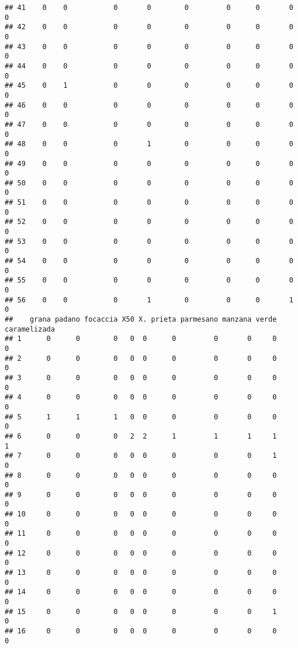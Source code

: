 \documentclass[
]{article}
\begin{document}
\begin{verbatim}
## 41    0    0           0       0        0         0      0       0         0
## 42    0    0           0       0        0         0      0       0         0
## 43    0    0           0       0        0         0      0       0         0
## 44    0    0           0       0        0         0      0       0         0
## 45    0    1           0       0        0         0      0       0         0
## 46    0    0           0       0        0         0      0       0         0
## 47    0    0           0       0        0         0      0       0         0
## 48    0    0           0       1        0         0      0       0         0
## 49    0    0           0       0        0         0      0       0         0
## 50    0    0           0       0        0         0      0       0         0
## 51    0    0           0       0        0         0      0       0         0
## 52    0    0           0       0        0         0      0       0         0
## 53    0    0           0       0        0         0      0       0         0
## 54    0    0           0       0        0         0      0       0         0
## 55    0    0           0       0        0         0      0       0         0
## 56    0    0           0       1        0         0      0       1         0
##    grana padano focaccia X50 X. prieta parmesano manzana verde caramelizada
## 1      0      0        0   0  0      0         0       0     0            0
## 2      0      0        0   0  0      0         0       0     0            0
## 3      0      0        0   0  0      0         0       0     0            0
## 4      0      0        0   0  0      0         0       0     0            0
## 5      1      1        1   0  0      0         0       0     0            0
## 6      0      0        0   2  2      1         1       1     1            1
## 7      0      0        0   0  0      0         0       0     1            0
## 8      0      0        0   0  0      0         0       0     0            0
## 9      0      0        0   0  0      0         0       0     0            0
## 10     0      0        0   0  0      0         0       0     0            0
## 11     0      0        0   0  0      0         0       0     0            0
## 12     0      0        0   0  0      0         0       0     0            0
## 13     0      0        0   0  0      0         0       0     0            0
## 14     0      0        0   0  0      0         0       0     0            0
## 15     0      0        0   0  0      0         0       0     1            0
## 16     0      0        0   0  0      0         0       0     0            0

\end{verbatim}
\end{document}
